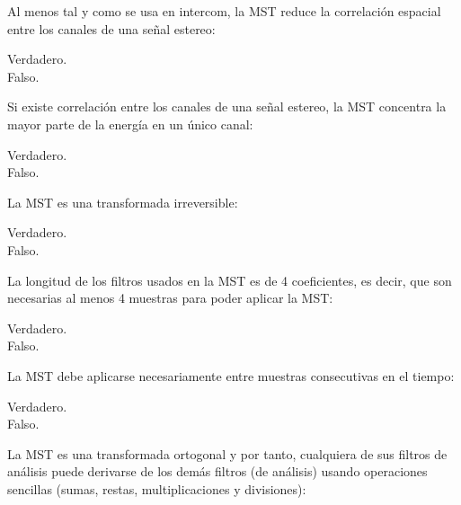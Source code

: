 \documentclass[legalpaper, 12pt, addpoints]{exam}
\begin{document}
\begin{questions}
\vspace{0.10in}

\question Al menos tal y como se usa en intercom, la MST reduce la correlación espacial entre los canales de una señal estereo:

\begin{oneparchoices}
  \choice Verdadero.\\
  \choice Falso.
\end{oneparchoices}
  
\vspace{0.10in}

\question Si existe correlación entre los canales de una señal estereo, la MST concentra la mayor parte de la energía en un único canal:

\begin{oneparchoices}
  \choice Verdadero.\\
  \choice Falso.
\end{oneparchoices}
  
\vspace{0.10in}

\question La MST es una transformada irreversible:

\begin{oneparchoices}
  \choice Verdadero.\\
  \choice Falso.
\end{oneparchoices}
  
\vspace{0.10in}

\question La longitud de los filtros usados en la MST es de 4 coeficientes, es decir, que son necesarias al menos 4 muestras para poder aplicar la MST:

\begin{oneparchoices}
  \choice Verdadero.\\
  \choice Falso.
\end{oneparchoices}
  
\vspace{0.10in}

\question La MST debe aplicarse necesariamente entre muestras consecutivas en el tiempo:

\begin{oneparchoices}
  \choice Verdadero.\\
  \choice Falso.
\end{oneparchoices}
  
\vspace{0.10in}

\question La MST es una transformada ortogonal y por tanto, cualquiera
de sus filtros de análisis puede derivarse de los demás filtros (de
análisis) usando operaciones sencillas (sumas, restas,
multiplicaciones y divisiones):


\end{questions}
\end{document}
